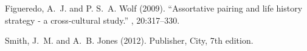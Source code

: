 \documentclass[EJ]{IAEE}
\begin{document}
\begin{thebibliography}{99}


Figueredo, A.~J. and P. S.~A. Wolf (2009).
\newblock ``Assortative pairing and life history strategy - a cross-cultural study.''
, 20:317--330.


Smith, J.~M. and A.~B. Jones (2012).
\newblock Publisher, City, 7th edition.




\end{thebibliography}

\end{document}
